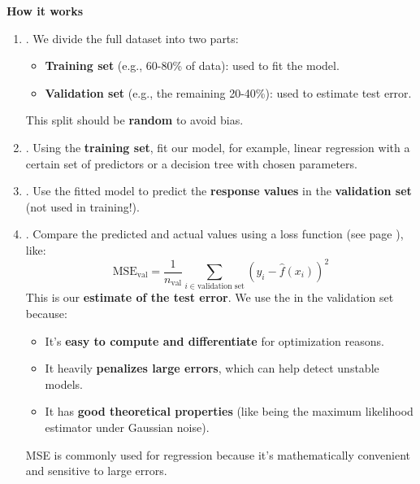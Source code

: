 \highspace
\begin{flushleft}
    \textcolor{Green3}{ \textbf{How it works}}
\end{flushleft}
\begin{enumerate}
    \item {}. We divide the full dataset into two parts:
    \begin{itemize}
        \item \textbf{Training set} (e.g., 60-80\% of data): used to fit the model.
        \item \textbf{Validation set} (e.g., the remaining 20-40\%): used to estimate test error.
    \end{itemize}
    This split should be \textbf{random} to avoid bias.

    \item {}. Using the \textbf{training set}, fit our model, for example, linear regression with a certain set of predictors or a decision tree with chosen parameters.
    
    \item {}. Use the fitted model to predict the \textbf{response values} in the \textbf{validation set} (not used in training!).
    
    \item {}. Compare the predicted and actual values using a loss function (see page \pageref{def: Loss Function}), like:
    \begin{equation*}
        \text{MSE}_\text{val} = \frac{1}{n_\text{val}} \sum_{i \in \text{validation set}} (y_i - \hat{f}(x_i))^2
    \end{equation*}
    This is our \textbf{estimate of the test error}. We use the  in the validation set because:
    \begin{itemize}
        \item It's \textbf{easy to compute and differentiate} for optimization reasons.
        \item It heavily \textbf{penalizes large errors}, which can help detect unstable models.
        \item It has \textbf{good theoretical properties} (like being the maximum likelihood estimator under Gaussian noise).
    \end{itemize}
    MSE is commonly used for regression because it's mathematically convenient and sensitive to large errors.
\end{enumerate}

